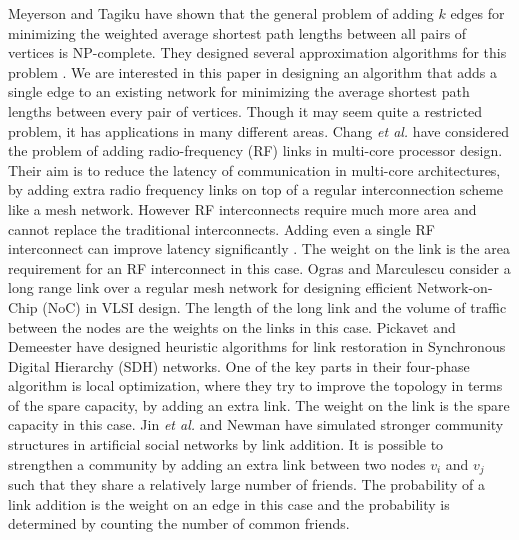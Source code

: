 \documentclass[journal,final,twocolumn,10pt,twoside]{IEEEtranTCOM}
\begin{document}
Meyerson and Tagiku \cite{MT} have shown that the general problem of adding $k$ edges for minimizing 
the weighted average shortest path lengths between all pairs of vertices is NP-complete. They designed 
several approximation algorithms for this problem \cite{MT}. We are 
interested in this paper in designing an algorithm that adds a single edge to an existing network 
for minimizing the average shortest path lengths between every pair of vertices. Though it may 
seem quite a restricted problem, it has applications in many different areas. Chang {\em et al.}
\cite{CCKN,CSTC} have considered the problem of adding radio-frequency (RF) links in multi-core processor 
design. Their aim is to reduce the latency of communication in multi-core architectures, by adding 
extra radio frequency links on top of a regular interconnection scheme like a mesh network. However 
RF interconnects require much more area and cannot replace the traditional interconnects. Adding even 
a single RF interconnect can improve latency significantly \cite{CCKN,CSTC}. The weight on 
the link is the area requirement for an RF interconnect in this case. Ogras and Marculescu \cite{OM} 
consider a long range link over a regular mesh network for designing efficient Network-on-Chip (NoC) 
in VLSI design. The length of the long link and the volume of traffic between the nodes are  the weights 
on the links in this case. Pickavet and Demeester 
\cite{PD} have designed heuristic algorithms for link restoration in Synchronous Digital Hierarchy (SDH)
networks. One of the key parts in their four-phase algorithm is local optimization, where they 
try to improve the topology in terms of the spare capacity, by adding an extra link. The weight 
on the link is the spare capacity in this case. Jin {\em et al.} \cite{JGN} and Newman \cite{N} 
have simulated stronger community structures in artificial social networks by link addition. It 
is possible to strengthen a community by adding an extra link between two nodes $v_i$ and $v_j$ 
such that they share a relatively large number of friends. The probability of a link addition 
is the weight on an edge in this case and the probability is determined by counting the number of common 
friends.     
\end{document}
